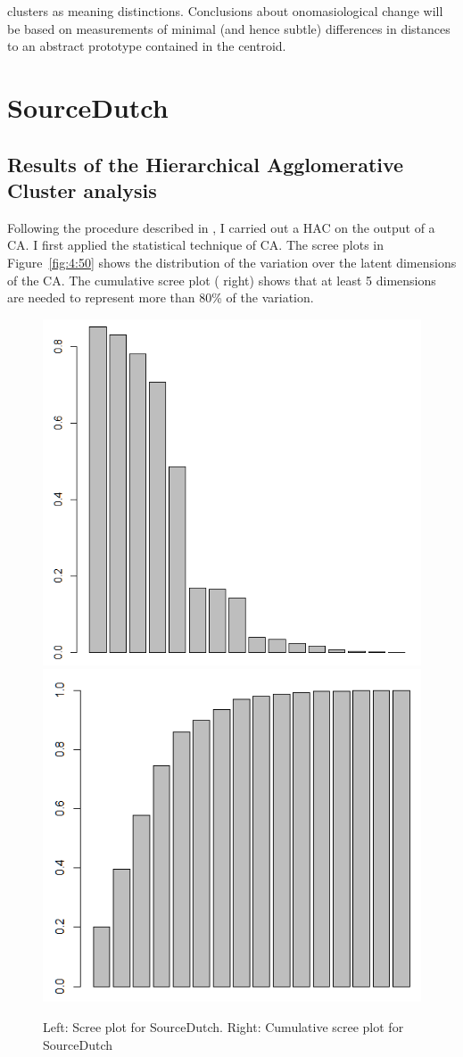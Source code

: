 clusters as meaning distinctions. Conclusions about onomasiological change will be based on measurements of minimal (and hence subtle) differences in distances to an abstract prototype contained in the centroid. 

\section{SourceDutch}
\label{sec:4.2}  
\subsection{Results of the Hierarchical Agglomerative Cluster analysis}
\label{sec:4.2.1}  
Following the procedure described in , I carried out a HAC on the output of a CA. I first applied the statistical technique of CA. The scree plots in Figure~\ref{fig:4:50} shows the distribution of the variation over the latent dimensions of the CA. The cumulative scree plot ( right) shows that at least 5 dimensions are needed to represent more than 80\% of the variation.

\begin{figure}
\includegraphics[width=.48\textwidth]{figures/Vandevoorde2-img50.png}\hfill%
\includegraphics[width=.48\textwidth]{figures/Vandevoorde2-img51.png}
\caption{\label{fig:4:50}Left: Scree plot for SourceDutch. Right: \label{fig:4:51}Cumulative scree plot for SourceDutch}
\end{figure}

